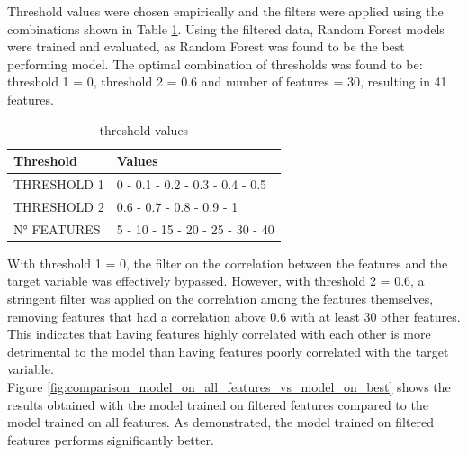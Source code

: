Threshold values were chosen empirically and the filters were applied using the combinations shown in Table \ref{tab:threshold_values}.
Using the filtered data, Random Forest models were trained and evaluated, as Random Forest was found to be the best performing model.
The optimal combination of thresholds was found to be: threshold 1 = 0, threshold 2 = 0.6 and number of features = 30, resulting in 41 features.

\begin{table}[h]
    \centering
    \small
    \begin{tabular}{|ll|}
        \hline
        \textbf{Threshold} & \textbf{Values}                 \\
        \hline
        THRESHOLD 1        & 0 - 0.1 - 0.2 - 0.3 - 0.4 - 0.5 \\
        THRESHOLD 2        & 0.6 - 0.7 - 0.8 - 0.9 - 1       \\
        N° FEATURES        & 5 - 10 - 15 - 20 - 25 - 30 - 40 \\
        \hline
    \end{tabular}
    \caption{threshold values}
    \label{tab:threshold_values}
\end{table}
\noindent
With threshold 1 = 0, the filter on the correlation between the features and the target variable was effectively bypassed.
However, with threshold 2 = 0.6, a stringent filter was applied on the correlation among the features themselves,
removing features that had a correlation above 0.6 with at least 30 other features. This indicates that having features
highly correlated with each other is more detrimental to the model than having features poorly correlated with the target variable.\\
Figure \ref{fig:comparison_model_on_all_features_vs_model_on_best} shows the results obtained with the model trained on filtered features
compared to the model trained on all features. As demonstrated, the model trained on filtered features performs significantly better.

